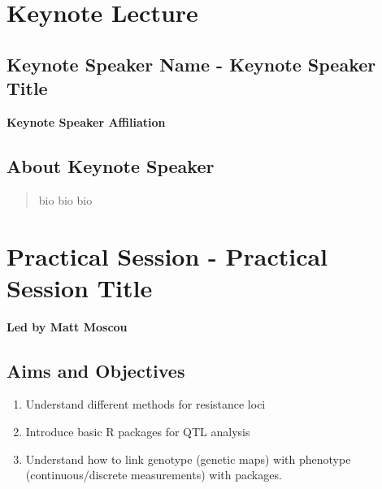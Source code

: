 \documentclass[12pt,]{book}
\providecommand{\tightlist}{%
  \setlength{\itemsep}{0pt}\setlength{\parskip}{0pt}}
\begin{document}
\section*{Keynote Lecture}\label{keynote-lecture-7}

\subsection*{Keynote Speaker Name - Keynote Speaker
Title}\label{keynote-speaker-name---keynote-speaker-title-3}

\textbf{Keynote Speaker Affiliation}

\subsection*{About Keynote Speaker}\label{about-keynote-speaker-3}

\begin{quote}
bio bio bio
\end{quote}

\section*{Practical Session - Practical Session
Title}\label{practical-session---practical-session-title-3}

\textbf{Led by Matt Moscou}

\subsection*{Aims and Objectives}\label{aims-and-objectives-7}

\begin{enumerate}
\def\labelenumi{\arabic{enumi}.}
\tightlist
\item
  Understand different methods for resistance loci
\item
  Introduce basic R packages for QTL analysis
\item
  Understand how to link genotype (genetic maps) with phenotype
  (continuous/discrete measurements) with packages.
\end{enumerate}
\end{document}
